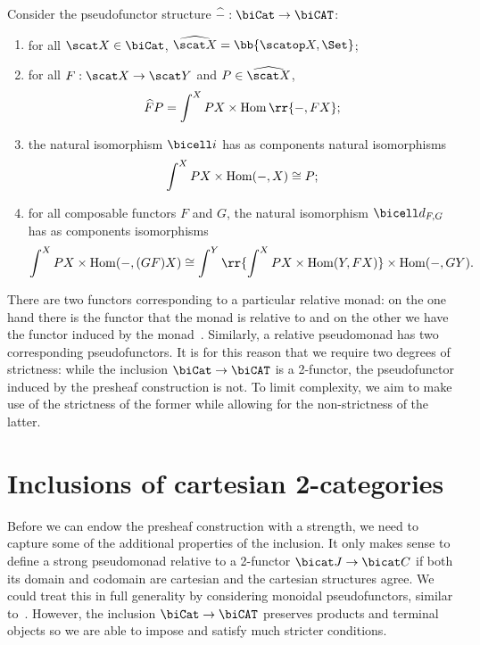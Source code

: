 \begin{example}\label{ex:presheaf_pseudofunctor}
  Consider the pseudofunctor structure $\widehat{-} : \biCat\to\biCAT$:
  \begin{enumerate}
    \item for all $\scat X\in\biCat$, $\widehat{\scat X}=\bb{\scatop X,\Set}$;
    \item for all $F:\scat X\to\scat Y$ and $P\in\widehat{\scat X}$,
      \begin{align*}
        \widehat{F}P = \int^X PX\times\Hom\rr{-,FX};
      \end{align*}
    \item the natural isomorphism $\bicell i$ has as components natural isomorphisms
      \begin{align*}
        \int^X PX\times\operatorname{Hom}(-,X) \cong P;
      \end{align*}
    \item for all composable functors $F$ and $G$, the natural isomorphism $\bicell d_{F,G}$
      has as components isomorphisms
      \begin{align*}
        \int^X PX\times\Hom(-,(GF)X) \cong \int^Y\rr{\int^X PX\times\Hom(Y,FX)}\times\Hom(-,GY).
      \end{align*}
  \end{enumerate}
\end{example}

There are two functors corresponding to a particular relative monad: on the one
hand there is the functor that the monad is relative to and on the other we
have the functor induced by the monad~\cite{altenkirch2015}. Similarly, a
relative pseudomonad has two corresponding pseudofunctors. It is for this
reason that we require two degrees of strictness: while the inclusion
$\biCat\to\biCAT$ is a 2-functor, the pseudofunctor induced by the presheaf
construction is not. To limit complexity, we aim to make use of the strictness
of the former while allowing for the non-strictness of the latter.

\section{Inclusions of cartesian 2-categories}

Before we can endow the presheaf construction with a strength, we need to
capture some of the additional properties of the inclusion. It only makes sense
to define a strong pseudomonad relative to a 2-functor $\bicat J\to\bicat C$ if
both its domain and codomain are cartesian and the cartesian structures agree.
We could treat this in full generality by considering monoidal pseudofunctors,
similar to~\cite{tarmo}. However, the inclusion $\biCat\to\biCAT$ preserves
products and terminal objects so we are able to impose and satisfy much stricter
conditions.

